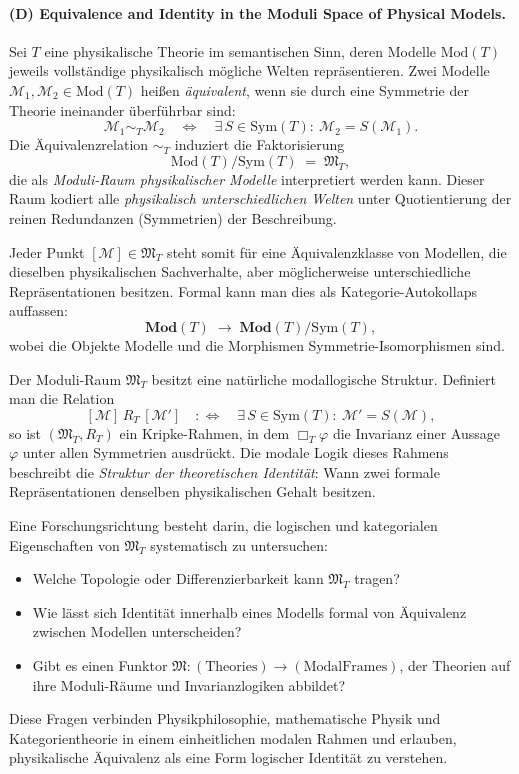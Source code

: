 \documentclass[10pt, letterpaper]{article}
\begin{document}
\paragraph{(D) Equivalence and Identity in the Moduli Space of Physical Models.}

Sei $T$ eine physikalische Theorie im semantischen Sinn, deren Modelle
$\mathrm{Mod}(T)$ jeweils vollständige physikalisch mögliche Welten repräsentieren.
Zwei Modelle $\mathcal{M}_1,\mathcal{M}_2\in\mathrm{Mod}(T)$ heißen
\emph{äquivalent}, wenn sie durch eine Symmetrie der Theorie ineinander überführbar sind:
\[
\mathcal{M}_1 \sim_T \mathcal{M}_2
\quad\Longleftrightarrow\quad
\exists\,S\in\mathrm{Sym}(T):\ \mathcal{M}_2 = S(\mathcal{M}_1).
\]
Die Äquivalenzrelation $\sim_T$ induziert die Faktorisierung
\[
\mathrm{Mod}(T)/\mathrm{Sym}(T)\;=\;\mathfrak{M}_T,
\]
die als \emph{Moduli-Raum physikalischer Modelle} interpretiert werden kann.
Dieser Raum kodiert alle \emph{physikalisch unterschiedlichen Welten}
unter Quotientierung der reinen Redundanzen (Symmetrien) der Beschreibung.

\smallskip
Jeder Punkt $[\mathcal{M}]\in \mathfrak{M}_T$ steht somit für eine Äquivalenzklasse
von Modellen, die dieselben physikalischen Sachverhalte,
aber möglicherweise unterschiedliche Repräsentationen besitzen.
Formal kann man dies als Kategorie-Autokollaps auffassen:
\[
\mathbf{Mod}(T) \;\longrightarrow\; \mathbf{Mod}(T)/\mathrm{Sym}(T),
\]
wobei die Objekte Modelle und die Morphismen Symmetrie-Isomorphismen sind.

\smallskip
Der Moduli-Raum $\mathfrak{M}_T$ besitzt eine natürliche modallogische Struktur.
Definiert man die Relation
\[
[\mathcal{M}]\,R_T\,[\mathcal{M}']\quad:\Longleftrightarrow\quad
\exists\,S\in\mathrm{Sym}(T):\ \mathcal{M}'=S(\mathcal{M}),
\]
so ist $(\mathfrak{M}_T,R_T)$ ein Kripke-Rahmen,
in dem $\Box_T\varphi$ die Invarianz einer Aussage $\varphi$
unter allen Symmetrien ausdrückt.
Die modale Logik dieses Rahmens beschreibt die \emph{Struktur der theoretischen Identität}:
Wann zwei formale Repräsentationen denselben physikalischen Gehalt besitzen.

\smallskip
Eine Forschungsrichtung besteht darin, die logischen und kategorialen Eigenschaften
von $\mathfrak{M}_T$ systematisch zu untersuchen:
\begin{itemize}
\item Welche Topologie oder Differenzierbarkeit kann $\mathfrak{M}_T$ tragen?
\item Wie lässt sich Identität innerhalb eines Modells formal von Äquivalenz zwischen Modellen unterscheiden?
\item Gibt es einen Funktor $\mathfrak{M}:(\text{Theories})\to(\text{ModalFrames})$, der Theorien auf ihre Moduli-Räume und Invarianzlogiken abbildet?
\end{itemize}
Diese Fragen verbinden Physikphilosophie, mathematische Physik und Kategorientheorie
in einem einheitlichen modalen Rahmen und erlauben, physikalische Äquivalenz als
eine Form logischer Identität zu verstehen.
\end{document}
